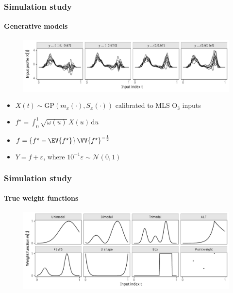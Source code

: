 \documentclass{snedecorbeamer}
\begin{document}
\begin{frame}
  \frametitle{Simulation study}
  \framesubtitle{Generative models}

  \begin{figure}
    \centering
    \includegraphics[width=\textwidth]{inc/syn01-inputs}
  \end{figure}

  \begin{itemize}
  \item $X(t)\sim\mathrm{GP}(m_x(\cdot), S_x(\cdot))$ calibrated to MLS O$_3$
    inputs
  \item $f^\star = \int_0^1 \sqrt{\omega(u)}\,X(u)\,\mathrm{d}u$
  \item $f = \left\{
      f^\star - \EV{f^\star}
    \right\} \VV{f^\star}^{-\frac{1}{2}}$
  \item $Y = f + \varepsilon$,
    where ${10}^{-1}\varepsilon\sim\mathcal{N}(0, 1)$
  \end{itemize}
\end{frame}

\begin{frame}
  \frametitle{Simulation study}
  \framesubtitle{True weight functions
    \hyperlink{frm:simulation-true}{}
  }

  \begin{figure}
    \centering
    \includegraphics[width=1\textwidth]{syn01-weight-true}
  \end{figure}
\end{frame}
\end{document}
